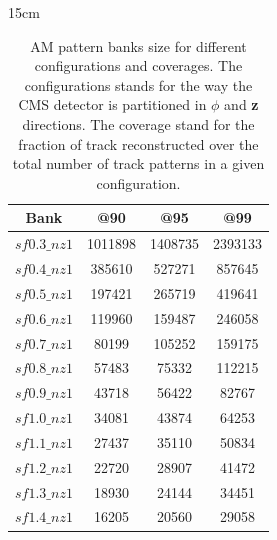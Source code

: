 \begin{table}[htbp]{15cm}
	\caption{AM pattern banks size for different configurations and coverages. The configurations stands for the way the CMS detector is partitioned in \textit{$\phi$} and \textbf{z} directions. The coverage stand for the fraction of track reconstructed over the total number of track patterns in a given configuration.}
	\centering
	\begin{tabular}{c|c|c|c}
		\hline
		\hline
		Bank         & @90     & @95     & @99\\
		\hline
		$sf0.3\_nz1$ & 1011898 & 1408735 & 2393133\\
		$sf0.4\_nz1$ & 385610  & 527271  & 857645\\		
		$sf0.5\_nz1$ & 197421  & 265719  & 419641\\
		$sf0.6\_nz1$ & 119960  & 159487  & 246058\\
		$sf0.7\_nz1$ & 80199   & 105252  & 159175\\
		$sf0.8\_nz1$ & 57483   & 75332   & 112215\\
		$sf0.9\_nz1$ & 43718   & 56422   & 82767\\
		$sf1.0\_nz1$ & 34081   & 43874   & 64253\\
		$sf1.1\_nz1$ & 27437   & 35110   & 50834\\
		$sf1.2\_nz1$ & 22720   & 28907   & 41472\\
		$sf1.3\_nz1$ & 18930   & 24144   & 34451\\
		$sf1.4\_nz1$ & 16205   & 20560   & 29058\\
		\hline		
	\end{tabular}
	\label{tab:banks_info_noDS}		
\end{table}

